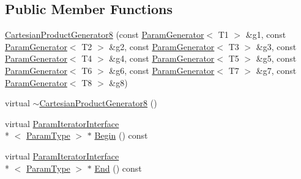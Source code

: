 \subsection*{Public Member Functions}
\begin{DoxyCompactItemize}
\item 
\hyperlink{classtesting_1_1internal_1_1_cartesian_product_generator8_a07f33a7263f933d4fbabdb9e930d7f86}{Cartesian\-Product\-Generator8} (const \hyperlink{classtesting_1_1internal_1_1_param_generator}{Param\-Generator}$<$ T1 $>$ \&g1, const \hyperlink{classtesting_1_1internal_1_1_param_generator}{Param\-Generator}$<$ T2 $>$ \&g2, const \hyperlink{classtesting_1_1internal_1_1_param_generator}{Param\-Generator}$<$ T3 $>$ \&g3, const \hyperlink{classtesting_1_1internal_1_1_param_generator}{Param\-Generator}$<$ T4 $>$ \&g4, const \hyperlink{classtesting_1_1internal_1_1_param_generator}{Param\-Generator}$<$ T5 $>$ \&g5, const \hyperlink{classtesting_1_1internal_1_1_param_generator}{Param\-Generator}$<$ T6 $>$ \&g6, const \hyperlink{classtesting_1_1internal_1_1_param_generator}{Param\-Generator}$<$ T7 $>$ \&g7, const \hyperlink{classtesting_1_1internal_1_1_param_generator}{Param\-Generator}$<$ T8 $>$ \&g8)
\item 
virtual \hyperlink{classtesting_1_1internal_1_1_cartesian_product_generator8_a1b5959a462274695cdee2c37185b291f}{$\sim$\-Cartesian\-Product\-Generator8} ()
\item 
virtual \hyperlink{classtesting_1_1internal_1_1_param_iterator_interface}{Param\-Iterator\-Interface}\\*
$<$ \hyperlink{classtesting_1_1internal_1_1_cartesian_product_generator8_ac0ce78b904e9a155d0f0711b9012ec0b}{Param\-Type} $>$ $\ast$ \hyperlink{classtesting_1_1internal_1_1_cartesian_product_generator8_a024b3406f95ada161eee58e7df008cf4}{Begin} () const 
\item 
virtual \hyperlink{classtesting_1_1internal_1_1_param_iterator_interface}{Param\-Iterator\-Interface}\\*
$<$ \hyperlink{classtesting_1_1internal_1_1_cartesian_product_generator8_ac0ce78b904e9a155d0f0711b9012ec0b}{Param\-Type} $>$ $\ast$ \hyperlink{classtesting_1_1internal_1_1_cartesian_product_generator8_a2a6e4ba6ad072f85c1193e1d17983f5f}{End} () const 
\end{DoxyCompactItemize}


